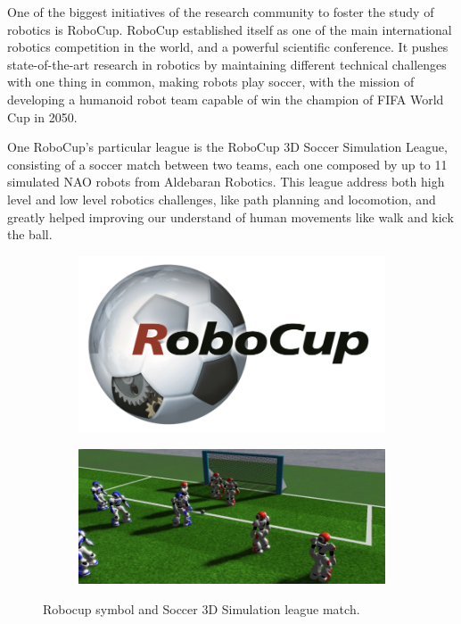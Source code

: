 
One of the biggest initiatives of the research community to foster the study of robotics is RoboCup. RoboCup established itself as one of the main international robotics competition in the world, and a powerful scientific conference. It pushes state-of-the-art research in robotics by maintaining different technical challenges with one thing in common, making robots play soccer, with the mission of developing a humanoid robot team capable of win the champion of FIFA World Cup in 2050.

One RoboCup's particular league is the RoboCup 3D Soccer Simulation League, consisting of a soccer match between two teams, each one composed by up to 11 simulated NAO robots from Aldebaran Robotics. This league address both high level and low level robotics challenges, like path planning and locomotion, and greatly helped improving our understand of human movements like walk and kick the ball.

\begin{figure}[ht]
  	\centering
  	\begin{subfigure}[b]{0.45\textwidth}
              \centering
	 		\includegraphics[height=0.13\textheight]{Chapter1/RoboCup.png}	
     \end{subfigure}
     
	 \begin{subfigure}[b]{0.45\textwidth}
              \centering
	 		\includegraphics[height=0.13\textheight]{Chapter1/SS3D.png}
	 \end{subfigure}
	     
	 \caption{Robocup symbol and Soccer 3D Simulation league match.}
	\label{fig:robocup}
\end{figure}

